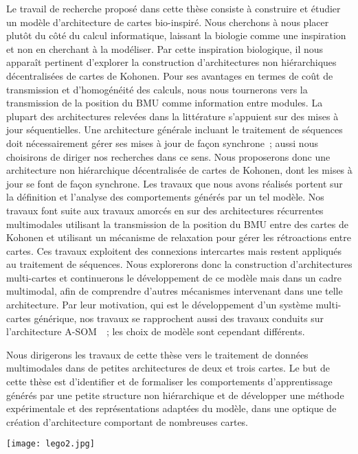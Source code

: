 \documentclass[../main]{subfiles}
\begin{document}
Le travail de recherche proposé dans cette thèse consiste à construire et étudier un modèle d'architecture de cartes bio-inspiré.
Nous cherchons à nous placer plutôt du côté du calcul informatique, laissant la biologie comme une inspiration et non en cherchant à la modéliser. 
Par cette inspiration biologique, il nous apparaît pertinent d'explorer la construction d'architectures non hiérarchiques décentralisées de cartes de Kohonen. Pour ses avantages en termes de coût de transmission et d'homogénéité des calculs, nous nous tournerons vers la transmission de la position du BMU comme information entre modules.
La plupart des architectures relevées dans la littérature s'appuient sur des mises à jour séquentielles. 
Une architecture générale incluant le traitement de séquences doit nécessairement gérer ses mises à jour de façon synchrone~; aussi nous choisirons de diriger nos recherches dans ce sens.
Nous proposerons donc une architecture non hiérarchique décentralisée de cartes de Kohonen, dont les mises à jour se font de façon synchrone. Les travaux que nous avons réalisés portent sur la définition et l'analyse des comportements générés par un tel modèle.
Nos travaux font suite aux travaux amorcés en \cite{baheux_towards_2014} sur des architectures récurrentes multimodales utilisant la transmission de la position du BMU entre des cartes de Kohonen et utilisant un mécanisme de relaxation pour gérer les rétroactions entre cartes.
Ces travaux exploitent des connexions intercartes mais restent appliqués au traitement de séquences.
Nous explorerons donc la construction d'architectures multi-cartes et continuerons le développement de ce modèle mais dans un cadre multimodal, afin de comprendre d'autres mécanismes intervenant dans une telle architecture.
Par leur motivation, qui est le développement d'un système multi-cartes générique, nos travaux se rapprochent aussi des travaux conduits sur l'architecture A-SOM~\cite{johnsson_associating_2008, johnsson_associative_2009,gil_sarasom_2015, Buonamente2015DiscriminatingAS}~; les choix de modèle sont cependant différents.

Nous dirigerons les travaux de cette thèse vers le traitement de données multimodales dans de petites architectures de deux et trois cartes.
Le but de cette thèse est d'identifier et de formaliser les comportements d'apprentissage générés par une petite structure non hiérarchique et de développer une méthode expérimentale et des représentations adaptées du modèle, dans une optique de création d'architecture comportant de nombreuses cartes.

\begin{figure*}[b]
    \centering\texttt{[image: lego2.jpg]}
\end{figure*}

\ifSubfilesClassLoaded{
    \printbibliography
}{}
\end{document}
